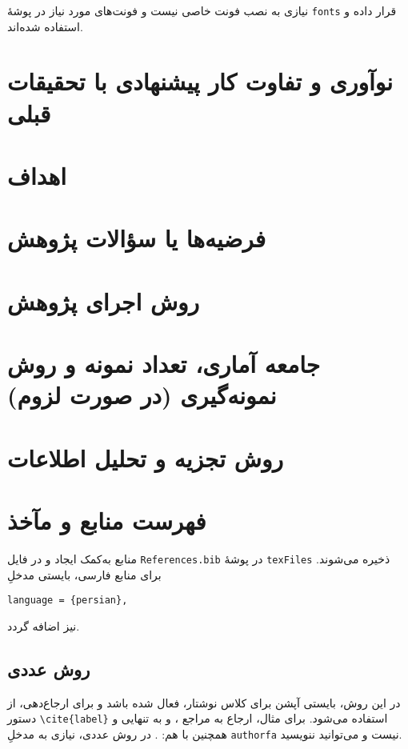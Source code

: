 نیازی به نصب فونت خاصی نیست و فونت‌های مورد نیاز در پوشۀ
\texttt{fonts}
قرار داده و استفاده شده‌اند.

\section{نوآوری و تفاوت کار پیشنهادی با تحقیقات قبلی}

\section{اهداف}

\section{فرضیه‌ها یا سؤالات پژوهش}

\section{روش اجرای پژوهش}

\section{%
	جامعه آماری، تعداد نمونه و روش نمونه‌گیری (در صورت لزوم)}

\section{روش تجزیه و تحلیل اطلاعات}

\section{فهرست منابع و مآخذ}
منابع به‌کمک
ایجاد و در فایل
\verb|References.bib|
در پوشهٔ
\verb|texFiles|
ذخیره می‌شوند. برای منابع فارسی، بایستی مدخلِ
\begin{LTR}
	\verb|language = {persian},|
\end{LTR}\noindent
نیز اضافه گردد.

\subsection{روش عددی}
در این روش، بایستی آپشن
برای کلاس نوشتار، فعال شده باشد و برای ارجاع‌دهی، از دستور
\verb|\cite{label}|
استفاده می‌شود. برای مثال، ارجاع به مراجع
\cite[فصل 4]{abtahi1388latex}،
\cite{oommen2002}
و
\cite{knuth1984texbook}
به تنهایی و همچنین با هم:
\cite{abtahi1388latex,oommen2002,knuth1984texbook}.
در روش عددی، نیازی به مدخلِ
\texttt{authorfa}
نیست و می‌توانید ننویسید.

